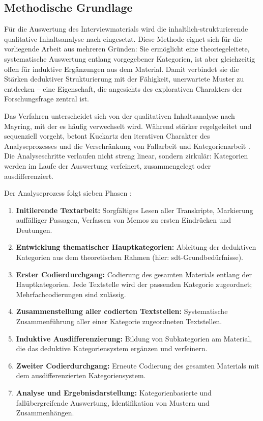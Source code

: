 \subsection{Methodische Grundlage}

Für die Auswertung des Interviewmaterials wird die inhaltlich-strukturierende qualitative Inhaltsanalyse nach \textcite{kuckartzQualitativeInhaltsanalyseMethoden2018} eingesetzt. Diese Methode eignet sich für die vorliegende Arbeit aus mehreren Gründen: Sie ermöglicht eine theoriegeleitete, systematische Auswertung entlang vorgegebener Kategorien, ist aber gleichzeitig offen für induktive Ergänzungen aus dem Material. Damit verbindet sie die Stärken deduktiver Strukturierung mit der Fähigkeit, unerwartete Muster zu entdecken -- eine Eigenschaft, die angesichts des explorativen Charakters der Forschungsfrage zentral ist.

Das Verfahren unterscheidet sich von der qualitativen Inhaltsanalyse nach Mayring, mit der es häufig verwechselt wird. Während \textcite{mayring2016} stärker regelgeleitet und sequenziell vorgeht, betont Kuckartz den iterativen Charakter des Analyseprozesses und die Verschränkung von Fallarbeit und Kategorienarbeit \parencite{kuckartzQualitativeInhaltsanalyseMethoden2018}. Die Analyseschritte verlaufen nicht streng linear, sondern zirkulär: Kategorien werden im Laufe der Auswertung verfeinert, zusammengelegt oder ausdifferenziert.

Der Analyseprozess folgt sieben Phasen \parencite{kuckartzQualitativeInhaltsanalyseMethoden2018}:

\begin{enumerate}
    \item \textbf{Initiierende Textarbeit:} Sorgfältiges Lesen aller Transkripte, Markierung auffälliger Passagen, Verfassen von Memos zu ersten Eindrücken und Deutungen.
    \item \textbf{Entwicklung thematischer Hauptkategorien:} Ableitung der deduktiven Kategorien aus dem theoretischen Rahmen (hier: \acrshort{sdt}-Grundbedürfnisse).
    \item \textbf{Erster Codierdurchgang:} Codierung des gesamten Materials entlang der Hauptkategorien. Jede Textstelle wird der passenden Kategorie zugeordnet; Mehrfachcodierungen sind zulässig.
    \item \textbf{Zusammenstellung aller codierten Textstellen:} Systematische Zusammenführung aller einer Kategorie zugeordneten Textstellen.
    \item \textbf{Induktive Ausdifferenzierung:} Bildung von Subkategorien am Material, die das deduktive Kategoriensystem ergänzen und verfeinern.
    \item \textbf{Zweiter Codierdurchgang:} Erneute Codierung des gesamten Materials mit dem ausdifferenzierten Kategoriensystem.
    \item \textbf{Analyse und Ergebnisdarstellung:} Kategorienbasierte und fallübergreifende Auswertung, Identifikation von Mustern und Zusammenhängen.
\end{enumerate}

